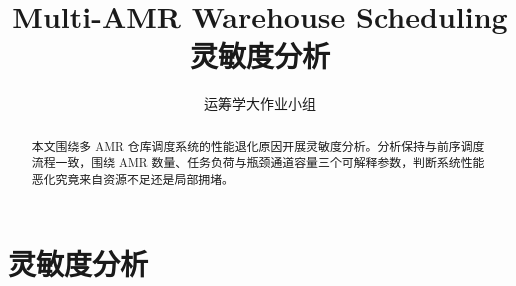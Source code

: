 \documentclass[lang=cn,chinesefont=ctexfont,a4paper,newtx]{elegantpaper}
\title{Multi-AMR Warehouse Scheduling 灵敏度分析}
\author{运筹学大作业小组}
\date{}
\begin{document}
\maketitle

\begin{abstract}
本文围绕多 AMR 仓库调度系统的性能退化原因开展灵敏度分析。分析保持与前序调度流程一致，围绕 AMR 数量、任务负荷与瓶颈通道容量三个可解释参数，判断系统性能恶化究竟来自资源不足还是局部拥堵。
\end{abstract}

\section{灵敏度分析}






\end{document}
